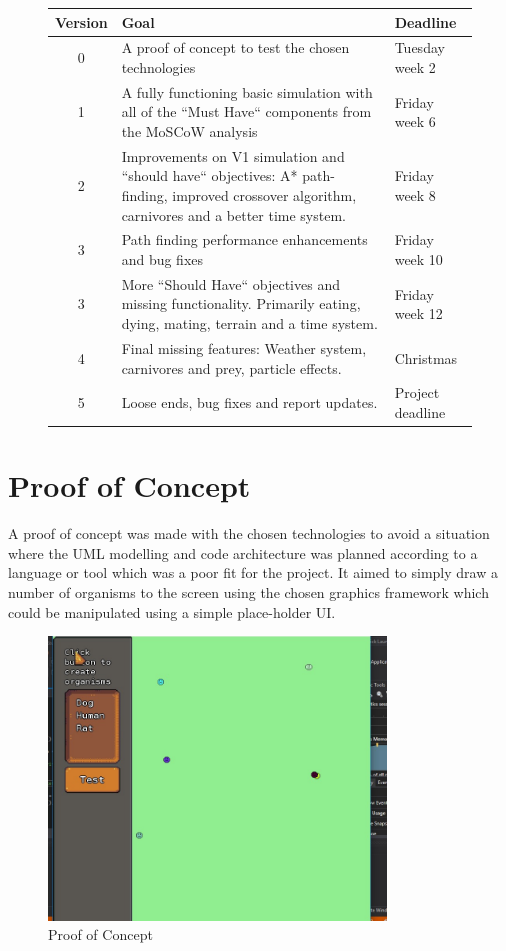 \documentclass[a4paper, oneside, 11pt]{report}
\begin{document}
\smallskip 
\begin{figure}[H]
	\centering
	\begin{tabular}{c|p{}|l} \label{version-table}
		Version & Goal & Deadline \\ \hline
		0 & A proof of concept to test the chosen technologies & Tuesday week 2 \\ \hline
		1 & A fully functioning basic simulation with all of the ``Must Have`` components from the MoSCoW analysis & Friday week 6 \\ \hline
		2 & Improvements on V1 simulation and ``should have`` objectives: A* path-finding, improved crossover algorithm, carnivores and a better time system. & Friday week 8 \\ \hline
		3 & Path finding performance enhancements and bug fixes & Friday week 10 \\ \hline
		3 & More ``Should Have`` objectives and missing functionality. Primarily eating, dying, mating, terrain and a time system. & Friday week 12 \\ \hline
		4 & Final missing features: Weather system, carnivores and prey, particle effects. & Christmas \\ \hline
		5 & Loose ends, bug fixes and report updates. & Project deadline \\ \hline
	\end{tabular}
\end{figure}
\smallskip 

\section{Proof of Concept}
A proof of concept was made with the chosen technologies to avoid a situation where the UML modelling and code architecture was planned according to a language or tool which was a poor fit for the project. It aimed to simply draw a number of organisms to the screen using the chosen graphics framework which could be manipulated using a simple place-holder UI.

\begin{figure}[H]
	\caption{Proof of Concept}\label{poc}
	\centering
	\includegraphics[width=0.8\textwidth]{poc}
\end{figure}
\end{document}
